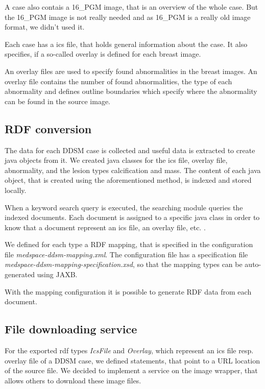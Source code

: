 A case also contais a 16\_PGM image, that is an overview of the whole case. But the 16\_PGM image is not really needed and as 16\_PGM is a really old image format, we didn't used it.

Each case has a ics file, that holds general information about the case. It also specifies, if a so-called overlay is defined for each breast image. 

An overlay files are used to specify found abnormalities in the breast images. An overlay file contains the number of found abnormalities, the type of each abnormality and defines outline boundaries which specify where the abnormality can be found in the source image.

\subsection{RDF conversion}

The data for each DDSM case is collected and useful data is extracted to create java objects from it. We created java classes for the ics file, overlay file, abnormality, and the lesion types calcification and mass. The content of each java object, that is created using the aforementioned method, is indexed and stored locally. 

When a keyword search query is executed, the searching module queries the indexed documents. Each document is assigned to a specific java class in order to know that a document represent an ics file, an overlay file, etc. .  

We defined for each type a RDF mapping, that is specified in the configuration file \emph{medspace-ddsm-mapping.xml}. The configuration file has a specification file \emph{medspace-ddsm-mapping-specification.xsd}, so that the mapping types can be auto-generated using JAXB.

With the mapping configuration it is possible to generate RDF data from each document.

\subsection{File downloading service}

For the exported rdf types \emph{IcsFile} and \emph{Overlay}, which represent an ics file resp. overlay file of a DDSM case, we defined statements, that point to a URL location of the source file. We decided to implement a service on the image wrapper, that allows others to download these image files. 

